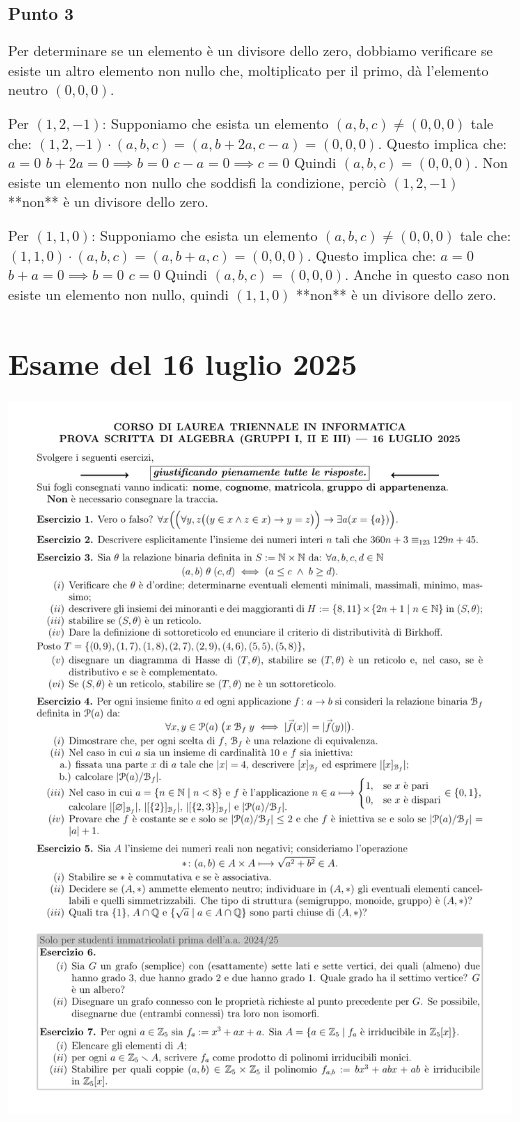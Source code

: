 \subsubsection*{Punto 3}
Per determinare se un elemento è un divisore dello zero, dobbiamo verificare se esiste un altro elemento non nullo che, moltiplicato per il primo, dà l'elemento neutro $(0,0,0)$.

Per $(1, 2, -1)$:
Supponiamo che esista un elemento $(a, b, c) \ne (0, 0, 0)$ tale che:
$(1, 2, -1) \cdot (a, b, c) = (a, b+2a, c-a) = (0, 0, 0)$.
Questo implica che:
$a = 0$
$b + 2a = 0 \implies b=0$
$c - a = 0 \implies c=0$
Quindi $(a, b, c) = (0, 0, 0)$. Non esiste un elemento non nullo che soddisfi la condizione, perciò $(1, 2, -1)$ **non** è un divisore dello zero.

Per $(1, 1, 0)$:
Supponiamo che esista un elemento $(a, b, c) \ne (0, 0, 0)$ tale che:
$(1, 1, 0) \cdot (a, b, c) = (a, b+a, c) = (0, 0, 0)$.
Questo implica che:
$a = 0$
$b + a = 0 \implies b=0$
$c = 0$
Quindi $(a, b, c) = (0, 0, 0)$. Anche in questo caso non esiste un elemento non nullo, quindi $(1, 1, 0)$ **non** è un divisore dello zero.

\section{Esame del 16 luglio 2025}
\begin{center}
	\includegraphics[scale=.85]{pdf/25-07-16.pdf}
\end{center}

